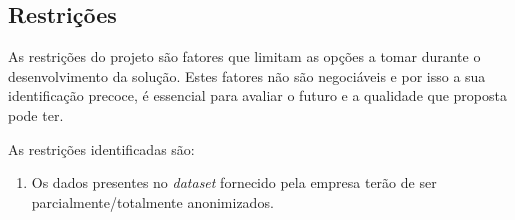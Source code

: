 	\subsection{Restrições}
	
		As restrições do projeto são fatores que limitam as opções a tomar durante o desenvolvimento da solução. Estes fatores não são negociáveis e por isso a sua identificação precoce, é essencial para avaliar o futuro e a qualidade que proposta pode ter.
		
		As restrições identificadas são:
		\begin{enumerate}
			\item Os dados presentes no \textit{dataset} fornecido pela empresa terão de ser parcialmente/totalmente anonimizados.
		\end{enumerate}